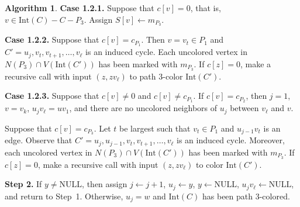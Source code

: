 \documentclass[12pt,letterpaper]{article}
\theoremstyle{plain}
\theoremstyle{definition}
\theoremstyle{break}
\newtheorem{algorithm}[lemma]{Algorithm}     %
\begin{document}
\begin{algorithm}
\textbf{Case 1.2.1.} Suppose that $c[v]=0$, that is, $v\in\text{Int}(C)-C-P_3$.
Assign $S[v]\leftarrow m_{P_3}$.

\textbf{Case 1.2.2.} Suppose that $c[v]=c_{P_1}$. Then
$v=v_t\in P_1$ and $C'=u_j,v_t,v_{t+1},\ldots,v_\ell$ is an
induced
cycle. Each uncolored vertex in $N(P_3)\cap
V(\text{Int}(C'))$ has been marked with $m_{P_3}$.
If $c[z]=0$, make a recursive call with input $(z, zv_\ell)$
to path $3$-color $\text{Int}(C')$.

\textbf{Case 1.2.3.} Suppose that $c[v]\ne 0$ and $c[v]\ne c_{P_1}$.
If $c[v]=c_{P_2}$, then $j=1$, $v=v_k$, $u_jv_\ell=uv_1$, and there are no
uncolored neighbors of $u_j$ between $v_\ell$ and $v$.

Suppose that $c[v]=c_{P_3}$. Let $t$ be largest such that
$v_t\in P_1$ and $u_{j-1}v_{t}$ is an edge. Observe that
$C'=u_j,u_{j-1},v_t,v_{t+1},\ldots,v_\ell$ is an induced cycle. Moreover,
each uncolored vertex in $N(P_3)\cap
V(\text{Int}(C'))$ has been marked with $m_{P_3}$.
If $c[z]=0$, make a recursive call with input $(z, zv_\ell)$ to
color $\text{Int}(C')$.

\textbf{Step 2.} If $y\ne\text{NULL}$, then 
assign $j\leftarrow j+1$, $u_j\leftarrow y$, $y\leftarrow\text{NULL}$,
$u_jv_\ell\leftarrow\text{NULL}$, and return to Step~1.
Otherwise, $u_j=w$ and $\text{Int}(C)$ has been path
$3$-colored.
\end{algorithm}
\end{document}

